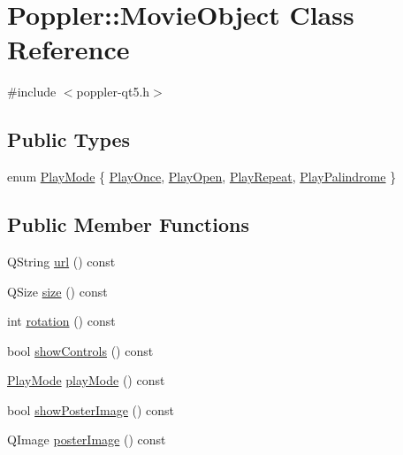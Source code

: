 \hypertarget{class_poppler_1_1_movie_object}{}\section{Poppler\+:\+:Movie\+Object Class Reference}
\label{class_poppler_1_1_movie_object}


{\ttfamily \#include $<$poppler-\/qt5.\+h$>$}

\subsection*{Public Types}
\begin{DoxyCompactItemize}
\item 
enum \hyperlink{class_poppler_1_1_movie_object_adeb798fc202760b8fa27d7a8a5a0e9b3}{Play\+Mode} \{ \hyperlink{class_poppler_1_1_movie_object_adeb798fc202760b8fa27d7a8a5a0e9b3a7618d55d8b421108284505b54f1b0ec8}{Play\+Once}, 
\hyperlink{class_poppler_1_1_movie_object_adeb798fc202760b8fa27d7a8a5a0e9b3af10563d90988e17a77784666d3412d32}{Play\+Open}, 
\hyperlink{class_poppler_1_1_movie_object_adeb798fc202760b8fa27d7a8a5a0e9b3a2e814873e82d3a6a72e325c0b70bec16}{Play\+Repeat}, 
\hyperlink{class_poppler_1_1_movie_object_adeb798fc202760b8fa27d7a8a5a0e9b3a103ee181c81f219c81e39c2518b27756}{Play\+Palindrome}
 \}
\end{DoxyCompactItemize}
\subsection*{Public Member Functions}
\begin{DoxyCompactItemize}
\item 
Q\+String \hyperlink{class_poppler_1_1_movie_object_a17efdfb3bec8e27f497e779c765e1ee8}{url} () const
\item 
Q\+Size \hyperlink{class_poppler_1_1_movie_object_a963410e08dcf8a836dce6344570b082d}{size} () const
\item 
int \hyperlink{class_poppler_1_1_movie_object_a7b8bab61a86d68fee6e0470d5fd21e99}{rotation} () const
\item 
bool \hyperlink{class_poppler_1_1_movie_object_a2ef9042f47b247ccefffaed387d0218d}{show\+Controls} () const
\item 
\hyperlink{class_poppler_1_1_movie_object_adeb798fc202760b8fa27d7a8a5a0e9b3}{Play\+Mode} \hyperlink{class_poppler_1_1_movie_object_ae460ca6d4cd34b7602af498a74d15235}{play\+Mode} () const
\item 
bool \hyperlink{class_poppler_1_1_movie_object_a853c1c14faadf40e0081cbdaca4b6936}{show\+Poster\+Image} () const
\item 
Q\+Image \hyperlink{class_poppler_1_1_movie_object_ab87b29b062869558463a48cff4f7a21e}{poster\+Image} () const
\end{DoxyCompactItemize}

